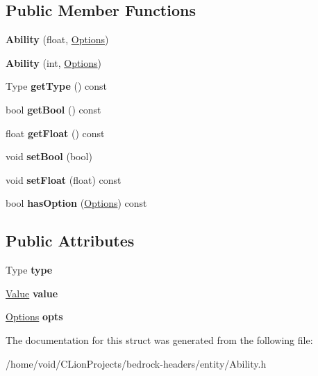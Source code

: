 \subsection*{Public Member Functions}
\begin{DoxyCompactItemize}
\item 
\mbox{\label{struct_ability_aa2db7ecbbbc585d4fac31a4580228a20}} 
{\bfseries Ability} (float, \mbox{\hyperlink{struct_options}{Options}})
\item 
\mbox{\label{struct_ability_a59f19e7d044e7943b025545b60a40254}} 
{\bfseries Ability} (int, \mbox{\hyperlink{struct_options}{Options}})
\item 
\mbox{\label{struct_ability_a8cb34573d3dd08c921ba5917caeec37c}} 
Type {\bfseries get\+Type} () const
\item 
\mbox{\label{struct_ability_ac29f5a178fdfcd58a280837fff51e36e}} 
bool {\bfseries get\+Bool} () const
\item 
\mbox{\label{struct_ability_ad3a46e09a6b0089cdb6c9dfce389e064}} 
float {\bfseries get\+Float} () const
\item 
\mbox{\label{struct_ability_a7246b38f767c6bd7202ee54670ae073e}} 
void {\bfseries set\+Bool} (bool)
\item 
\mbox{\label{struct_ability_a382086aa975f7b46399708e9f90a3f6a}} 
void {\bfseries set\+Float} (float) const
\item 
\mbox{\label{struct_ability_a97efbebcd8b5e2f5165d5596dc6e65a5}} 
bool {\bfseries has\+Option} (\mbox{\hyperlink{struct_options}{Options}}) const
\end{DoxyCompactItemize}
\subsection*{Public Attributes}
\begin{DoxyCompactItemize}
\item 
\mbox{\label{struct_ability_a2cd8ff8cc2fa08864b536d374798acbf}} 
Type {\bfseries type}
\item 
\mbox{\label{struct_ability_a0da13de8fc260bcb07b7877f01da7a9f}} 
\mbox{\hyperlink{union_ability_1_1_value}{Value}} {\bfseries value}
\item 
\mbox{\label{struct_ability_ac8d49e57130d84bd92a00fff41aa97df}} 
\mbox{\hyperlink{struct_options}{Options}} {\bfseries opts}
\end{DoxyCompactItemize}


The documentation for this struct was generated from the following file\+:\begin{DoxyCompactItemize}
\item 
/home/void/\+C\+Lion\+Projects/bedrock-\/headers/entity/Ability.\+h\end{DoxyCompactItemize}
